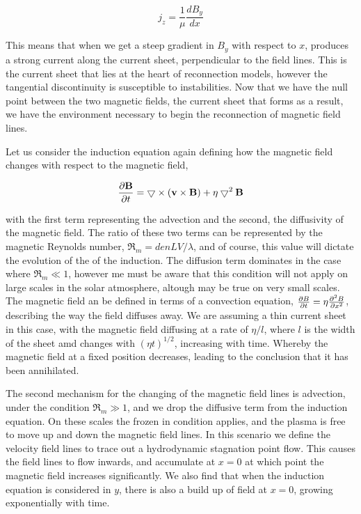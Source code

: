\begin{equation}
	j_z = \frac{1}{\mu}\frac{dB_y}{dx}
\end{equation}

This means that when we get a steep gradient in $B_y$ with respect to $x$, produces a strong current along the current sheet, perpendicular to the field lines.
This is the current sheet that lies at the heart of reconnection models, however the tangential discontinuity is susceptible to instabilities.
Now that we have the null point between the two magnetic fields, the current sheet that forms as a result, we have the environment necessary to begin the reconnection of magnetic field lines.

Let us consider the induction equation again defining how the magnetic field changes with respect to the magnetic field,

\begin{equation}
	\frac{\partial \mathbf{B}}{\partial t } = \bigtriangledown \times (\mathbf{v} \times \mathbf{B}) + \eta\bigtriangledown^2\mathbf{B}
\end{equation} 

with the first term representing the advection and the second, the diffusivity of the magnetic field.
The ratio of these two terms can be represented by the magnetic Reynolds number, $\Re_m = {den}LV/\lambda$, and of course, this value will dictate the evolution of the of the induction.
The diffusion term dominates in the case where $\Re_m \ll 1$, however me must be aware that this condition will not apply on large scales in the solar atmosphere, altough may be true on very small scales.
The magnetic field an be defined in terms of a convection equation, $\frac{\partial B}{\partial t } = \eta\frac{\partial^2B}{\partial x^2}$, describing the way the field diffuses away.
We are assuming a thin current sheet in this case, with the magnetic field diffusing at a rate of $\eta/l$, where $l$ is the width of the sheet amd changes with $(\eta t)^{1/2}$, increasing with time.
Whereby the magnetic field at a fixed position decreases, leading to the conclusion that it has been annihilated.

The second mechanism for the changing of the magnetic field lines is advection, under the condition $\Re_m \gg 1$, and we drop the diffusive term from the induction equation.
On these scales the frozen in condition applies, and the plasma is free to move up and down the magnetic field lines.
In this scenario we define the velocity field lines to trace out a hydrodynamic stagnation point flow.
This causes the field lines to flow inwards, and accumulate at $x = 0$ at which point the magnetic field increases significantly.
We also find that when the induction equation is considered in $y$, there is also a build up of field at $x = 0$, growing exponentially with time.

